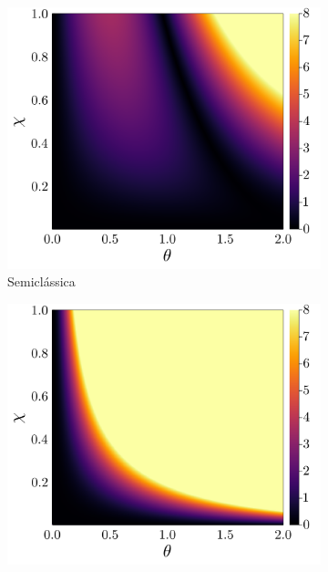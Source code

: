 \documentclass[
	12pt,
	oneside,			%
	a4paper,			%
	english,			%
	brazil				%
	]{abntex2}
\theoremstyle{definition}
\begin{document}
\begin{figure}[H]
     \centering
     \begin{subfigure}[b]{0.32\textwidth}
         \centering
         \includegraphics[width=\textwidth]{Imagens/erro_relativo_energia_sc.png}
         \caption{Semiclássica}
         \label{erro relativo kerr sc}
     \end{subfigure}
     \hfill
     \begin{subfigure}[b]{0.32\textwidth}
         \centering
         \includegraphics[width=\textwidth]{Imagens/erro_relativo_energia_kerr_dm.png}

\end{subfigure}
\end{figure}
\end{document}
